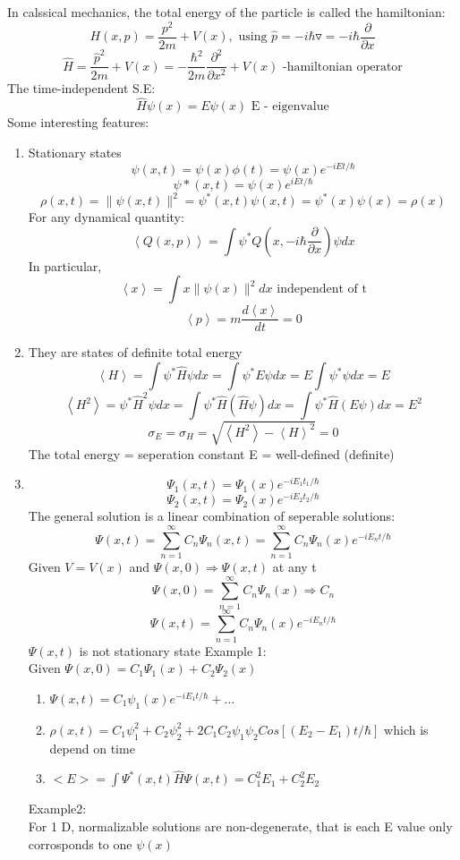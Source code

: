 \documentclass[12pt, a4paper]{article}
\begin{document}
In calssical mechanics, the total energy of the particle is called the hamiltonian: $$H(x,p)=\frac{p^2}{2m}+V(x), \text{ using } \hat p=-i\hbar \triangledown=-i\hbar \frac{\partial}{\partial x}$$
$$\hat H=\frac{\hat p^2}{2m}+V(x)=-\frac{\hbar^2}{2m}\frac{\partial ^2}{\partial x^2}+V(x) \text{ -hamiltonian operator}$$
The time-independent S.E: $$\hat H \psi(x)=E\psi(x) \text{ E - eigenvalue}$$
Some interesting features:
\begin{enumerate}
\item Stationary states
$$\psi(x,t)=\psi(x)\phi(t)=\psi(x)e^{-iEt/\hbar}$$
$$\psi*(x,t)=\psi(x)e^{iEt/\hbar}$$
$$\rho(x,t)=\|\psi(x,t)\|^2=\psi^*(x,t)\psi(x,t)=\psi^*(x)\psi(x)=\rho(x)$$
For any dynamical quantity: $$\left<Q(x,p)\right>=\int \psi^* Q(x,-i\hbar\frac{\partial}{\partial x})\psi dx$$
In particular, $$\left< x\right>=\int x\|\psi(x)\|^2dx \text{ independent of t}$$
$$\left< p\right> =m \frac{d\left<x \right>}{dt}=0$$
\item They are states of definite total energy
$$\left<H \right> =\int \psi^* \hat H \psi dx=\int \psi^* E\psi dx=E\int \psi^* \psi dx = E$$
$$\left<H^2 \right>=\psi^* \hat H^2 \psi dx=\int \psi^* \hat H (\hat H \psi)dx=\int \psi^* \hat H(E\psi)dx = E^2$$
$$\sigma_E=\sigma_H=\sqrt{\left<H^2\right> -\left<H\right>^2}=0$$
The total energy = seperation constant E = well-defined (definite)
\item 
$$\Psi_1(x,t)=\Psi_1(x)e^{-iE_1t_1/\hbar}$$
$$\Psi_2(x,t)=\Psi_2(x)e^{-iE_2t_2/\hbar}$$
The general solution is a linear combination of seperable solutions:
$$\Psi(x,t)=\sum_{n=1}^{\infty}C_n\Psi_n(x,t)=\sum_{n=1}^{\infty}C_n\Psi_n(x)e^{-iE_nt/\hbar}$$
Given $V=V(x)$ and $\Psi(x,0)\Rightarrow\Psi(x,t)$ at any t
$$\Psi(x,0)=\sum_{n=1}^{\infty}C_n\Psi_n(x)\Rightarrow C_n$$
$$\Psi(x,t)=\sum_{n=1}^{\infty}C_n\Psi_n(x)e^{-iE_nt/\hbar}$$
$\Psi(x,t)$ is not stationary state 
Example 1:\\
Given $\Psi(x,0)=C_1\Psi_1(x)+C_2\Psi_2(x)$
\begin{enumerate}
\item $\Psi(x,t)=C_1\psi_1(x)e^{-iE_1t/\hbar}+\hdots$
\item $\rho(x,t)=C_1\psi_1^2+C_2\psi_2^2+2C_1C_2\psi_1\psi_2Cos[(E_2-E_1)t/\hbar]$ which is depend on time
\item $<E>=\int \Psi^*(x,t)\hat{H}\Psi(x,t)=C_1^2E_1+C_2^2E_2$
\end{enumerate}
Example2:\\
For 1 D, normalizable solutions are non-degenerate, that is each E value only corrosponds to one $\psi(x)$\\

\end{enumerate}
\end{document}
